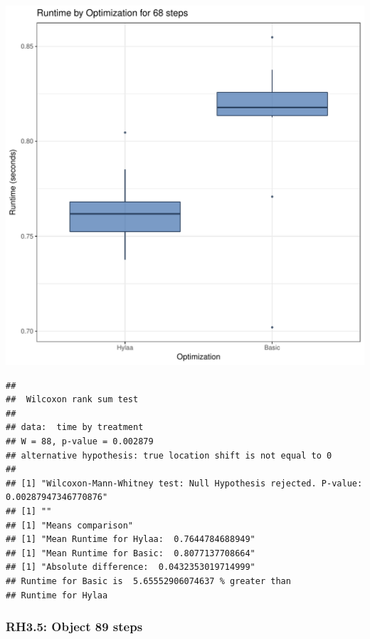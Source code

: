 \documentclass{article}\usepackage[]{graphicx}\usepackage[]{color}
\makeatletter
\def\maxwidth{ %
  \ifdim\Gin@nat@width>\linewidth
    \linewidth
  \else
    \Gin@nat@width
  \fi
}
\newenvironment{kframe}{%
 \def\at@end@of@kframe{}%
 \ifinner\ifhmode%
  \def\at@end@of@kframe{\end{minipage}}%
  \begin{minipage}{\columnwidth}%
 \fi\fi%
 \def\FrameCommand##1{\hskip\@totalleftmargin \hskip-\fboxsep
 \colorbox{shadecolor}{##1}\hskip-\fboxsep
     \hskip-\linewidth \hskip-\@totalleftmargin \hskip\columnwidth}%
 \MakeFramed {\advance\hsize-\width
   \@totalleftmargin\z@ \linewidth\hsize
   \@setminipage}}%
 {\par\unskip\endMakeFramed%
 \at@end@of@kframe}
\newenvironment{knitrout}{}{} %
\makeatother
\begin{document}
\begin{knitrout}
\color{fgcolor}
\includegraphics[width=\maxwidth]{figure/RH3_steps68-1} 
\begin{kframe}\begin{verbatim}
## 
## 	Wilcoxon rank sum test
## 
## data:  time by treatment
## W = 88, p-value = 0.002879
## alternative hypothesis: true location shift is not equal to 0
## 
## [1] "Wilcoxon-Mann-Whitney test: Null Hypothesis rejected. P-value: 0.00287947346770876"
## [1] ""
## [1] "Means comparison"
## [1] "Mean Runtime for Hylaa:  0.7644784688949"
## [1] "Mean Runtime for Basic:  0.8077137708664"
## [1] "Absolute difference:  0.0432353019714999"
## Runtime for Basic is  5.65552906074637 % greater than 
## Runtime for Hylaa
\end{verbatim}
\end{kframe}
\end{knitrout}


\subsubsection{RH3.5: Object 89 steps}
\end{document}
